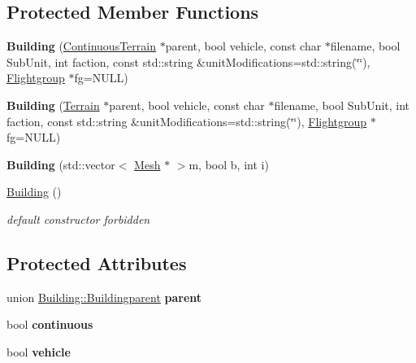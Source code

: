 \subsection*{Protected Member Functions}
\begin{DoxyCompactItemize}
\item 
{\bfseries Building} (\hyperlink{classContinuousTerrain}{Continuous\+Terrain} $\ast$parent, bool vehicle, const char $\ast$filename, bool Sub\+Unit, int faction, const std\+::string \&unit\+Modifications=std\+::string(\char`\"{}\char`\"{}), \hyperlink{classFlightgroup}{Flightgroup} $\ast$fg=N\+U\+LL)\hypertarget{classBuilding_a87165e4cf8b2b36d33e2f076295b4473}{}\label{classBuilding_a87165e4cf8b2b36d33e2f076295b4473}

\item 
{\bfseries Building} (\hyperlink{classTerrain}{Terrain} $\ast$parent, bool vehicle, const char $\ast$filename, bool Sub\+Unit, int faction, const std\+::string \&unit\+Modifications=std\+::string(\char`\"{}\char`\"{}), \hyperlink{classFlightgroup}{Flightgroup} $\ast$fg=N\+U\+LL)\hypertarget{classBuilding_a712e95b78d1096e73a613b724571957e}{}\label{classBuilding_a712e95b78d1096e73a613b724571957e}

\item 
{\bfseries Building} (std\+::vector$<$ \hyperlink{classMesh}{Mesh} $\ast$ $>$m, bool b, int i)\hypertarget{classBuilding_a66fd6dff6ffa0e44fcf95a4188718283}{}\label{classBuilding_a66fd6dff6ffa0e44fcf95a4188718283}

\item 
\hyperlink{classBuilding_ab570ec0a203ee621f9f522c678a147d9}{Building} ()\hypertarget{classBuilding_ab570ec0a203ee621f9f522c678a147d9}{}\label{classBuilding_ab570ec0a203ee621f9f522c678a147d9}

\begin{DoxyCompactList}\small\item\em default constructor forbidden \end{DoxyCompactList}\end{DoxyCompactItemize}
\subsection*{Protected Attributes}
\begin{DoxyCompactItemize}
\item 
union \hyperlink{unionBuilding_1_1Buildingparent}{Building\+::\+Buildingparent} {\bfseries parent}\hypertarget{classBuilding_a8774aeaa16ac2efc6aeda222ae46cdde}{}\label{classBuilding_a8774aeaa16ac2efc6aeda222ae46cdde}

\item 
bool {\bfseries continuous}\hypertarget{classBuilding_a4851130d70d11031001956ff4349bc6b}{}\label{classBuilding_a4851130d70d11031001956ff4349bc6b}

\item 
bool {\bfseries vehicle}\hypertarget{classBuilding_ab798aa517373319d2ea18cc140894389}{}\label{classBuilding_ab798aa517373319d2ea18cc140894389}

\end{DoxyCompactItemize}
